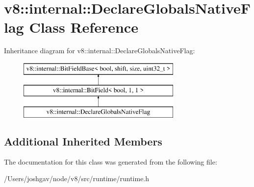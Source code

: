 \hypertarget{classv8_1_1internal_1_1_declare_globals_native_flag}{}\section{v8\+:\+:internal\+:\+:Declare\+Globals\+Native\+Flag Class Reference}
\label{classv8_1_1internal_1_1_declare_globals_native_flag}
Inheritance diagram for v8\+:\+:internal\+:\+:Declare\+Globals\+Native\+Flag\+:\begin{figure}[H]
\begin{center}
\leavevmode
\includegraphics[height=3.000000cm]{classv8_1_1internal_1_1_declare_globals_native_flag}
\end{center}
\end{figure}
\subsection*{Additional Inherited Members}


The documentation for this class was generated from the following file\+:\begin{DoxyCompactItemize}
\item 
/\+Users/joshgav/node/v8/src/runtime/runtime.\+h\end{DoxyCompactItemize}
